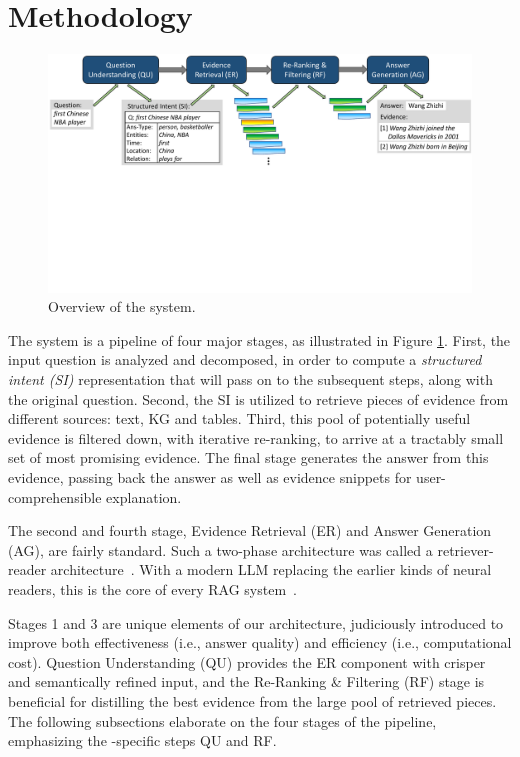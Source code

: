 \label{sec:method}
\section{Methodology}

\begin{figure}[tb]
  \includegraphics[width=\textwidth]{submissions/Gerhard2024/figures/compass-overview.pdf}
  \caption{Overview of the \method system.}
  \label{fig:compass-overview}
\end{figure}

The \method system is a pipeline of four major stages, as illustrated in Figure \ref{fig:compass-overview}.
First, the input question is analyzed and decomposed, in order to compute a {\em structured intent (SI)} representation that will pass on to the subsequent steps, along with the original question. Second, the SI is utilized to retrieve pieces of evidence from different sources: text, KG and tables. 
Third, this pool of potentially useful evidence is filtered down, with iterative re-ranking, to arrive at a tractably small set of most promising evidence.
The final stage generates the answer from this evidence,
passing back the answer as well as evidence snippets for user-comprehensible explanation.

The second and fourth stage, Evidence Retrieval (ER) and Answer Generation (AG), are fairly standard. Such a two-phase architecture was called a retriever-reader architecture~\cite{Zhu-ODQA-survey:arxiv2021}. With a modern LLM replacing the earlier kinds of neural readers, this is the core of every RAG system~\cite{DBLP:journals/arXiv/abs-2312-10997}.

Stages 1 and 3 are unique elements of our architecture, judiciously introduced to improve both effectiveness (i.e., answer quality) and efficiency (i.e., computational cost).
Question Understanding (QU) provides the ER component with crisper and semantically refined input, and
the Re-Ranking \& Filtering (RF) stage is beneficial for
distilling the best evidence from the large pool of retrieved pieces.
The following subsections elaborate on the four stages of the pipeline, emphasizing the \method-specific steps QU and RF.



